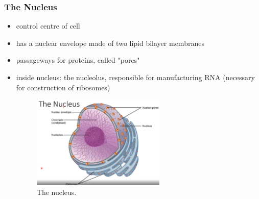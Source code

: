 \documentclass[10pt]{article}
\begin{document}
\subsubsection{The Nucleus}
\begin{itemize}
    \item control centre of cell
    \item has a nuclear envelope made of two lipid bilayer membranes
    \item passageways for proteins, called "pores"
    \item inside nucleus: the nucleolus, responsible for manufacturing RNA (necessary for construction of ribosomes)
    \begin{figure}[h]
        \centering
        \includegraphics[width=0.6\textwidth]{nucleus}
        \caption{The nucleus.}
        \label{fig:nucleus}
    \end{figure}
\end{itemize}
\end{document}
